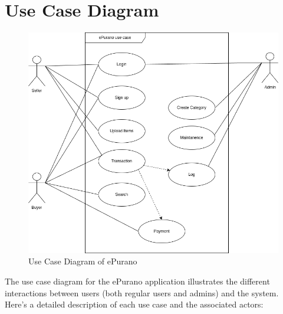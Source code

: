 \section{Use Case Diagram}
\begin{figure}[ht]
    \centering
    \includegraphics[scale=0.5]{../images/usecase.png}
    \caption{Use Case Diagram of ePurano}%
    \label{fig:usecase_diagram}
\end{figure}

The use case diagram for the ePurano application illustrates the different interactions between users (both regular users and admins) and the system. Here's a detailed description of each use case and the associated actors:

